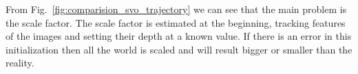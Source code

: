 
From Fig.~\ref{fig:comparision_svo_trajectory} we can see that the main problem is the scale factor. The scale factor is estimated at the beginning, tracking features of the images and setting their depth at a known value. If there is an error in this initialization then all the world is scaled and will result bigger or smaller than the reality.



